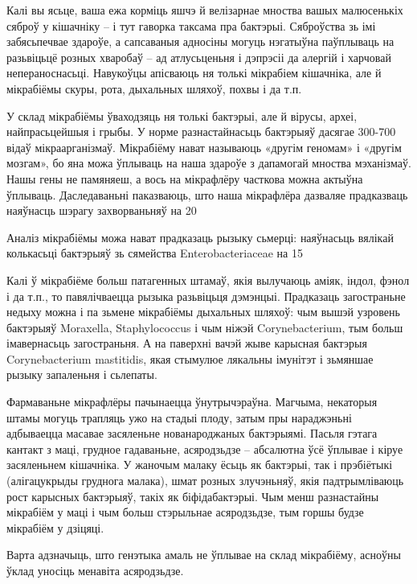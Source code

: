 Калі вы ясьце, ваша ежа корміць яшчэ й велізарнае мноства вашых малюсенькіх сяброў у кішачніку – і тут гаворка таксама пра бактэрыі. Сяброўства зь імі забясьпечвае здароўе, а сапсаваныя адносіны могуць нэгатыўна паўплываць на разьвіцьцё розных хваробаў – ад атлусьценьня і дэпрэсіі да алергій і харчовай непераноснасьці. Навукоўцы апісваюць ня толькі мікрабіем кішачніка, але й мікрабіёмы скуры, рота, дыхальных шляхоў, похвы і да т.п.

У склад мікрабіёмы ўваходзяць ня толькі бактэрыі, але й вірусы, археі, найпрасьцейшыя і грыбы. У норме разнастайнасьць бактэрыяў дасягае 300-700 відаў мікраарганізмаў. Мікрабіёму нават называюць «другім геномам» і «другім мозгам», бо яна можа ўплываць на наша здароўе з дапамогай мноства мэханізмаў. Нашы гены не памяняеш, а вось на мікрафлёру часткова можна актыўна ўплываць. Даследаваньні паказваюць, што наша мікрафлёра дазваляе прадказваць наяўнасць шэрагу захворваньняў на 20%

Аналіз мікрабіёмы можа нават прадказаць рызыку сьмерці: наяўнасьць вялікай колькасьці бактэрыяў зь сямейства Enterobacteriaceae на 15%

Калі ў мікрабіёме больш патагенных штамаў, якія вылучаюць аміяк, індол, фэнол і да т.п., то павялічваецца рызыка разьвіцьця дэмэнцыі. Прадказаць загостраньне недыху можна і па зьмене мікрабіёмы дыхальных шляхоў: чым вышэй узровень бактэрыяў Moraxella, Staphylococcus і чым ніжэй Corynebacterium, тым больш імавернасьць загостраньня. А на паверхні вачэй жыве карысная бактэрыя Corynebacterium mastitidis, якая стымулюе лякальны імунітэт і зьмяншае рызыку запаленьня і сьлепаты.

Фармаваньне мікрафлёры пачынаецца ўнутрычэраўна. Магчыма, некаторыя штамы могуць трапляць ужо на стадыі плоду, затым пры нараджэньні адбываецца масавае засяленьне нованароджаных бактэрыямі. Пасьля гэтага кантакт з маці, грудное гадаваньне, асяродзьдзе – абсалютна ўсё ўплывае і кіруе засяленьнем кішачніка. У жаночым малаку ёсьць як бактэрыі, так і прэбіётыкі (алігацукрыды груднога малака), шмат розных злучэньняў, якія падтрымліваюць рост карысных бактэрыяў, такіх як біфідабактэрыі. Чым менш разнастайны мікрабіём у маці і чым больш стэрыльнае асяродзьдзе, тым горшы будзе мікрабіём у дзіцяці.

Варта адзначыць, што генэтыка амаль не ўплывае на склад мікрабіёму, асноўны ўклад уносіць менавіта асяродзьдзе. 

